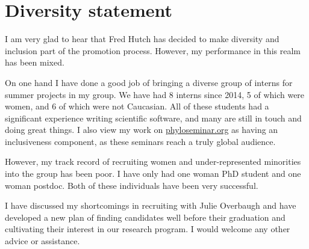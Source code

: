 \documentclass[nobib]{tufte-handout}
\begin{document}
\newpage




\newpage

\section{Diversity statement}

I am very glad to hear that Fred Hutch has decided to make diversity and inclusion part of the promotion process.
However, my performance in this realm has been mixed.

On one hand I have done a good job of bringing a diverse group of interns for summer projects in my group.
We have had 8 interns since 2014, 5 of which were women, and 6 of which were not Caucasian.
All of these students had a significant experience writing scientific software, and many are still in touch and doing great things.
I also view my work on \href{http://phyloseminar.org/}{phyloseminar.org} as having an inclusiveness component, as these seminars reach a truly global audience.

However, my track record of recruiting women and under-represented minorities into the group has been poor.
I have only had one woman PhD student and one woman postdoc.
Both of these individuals have been very successful.

I have discussed my shortcomings in recruiting with Julie Overbaugh and have developed a new plan of finding candidates well before their graduation and cultivating their interest in our research program.
I would welcome any other advice or assistance.
\end{document}
